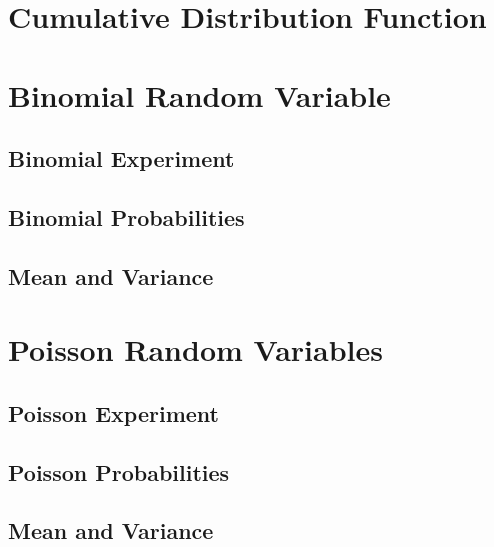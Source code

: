     \section{Cumulative Distribution Function}  %

    \section{Binomial Random Variable}  %
        \subsection{Binomial Experiment}  %
        \subsection{Binomial Probabilities}  %
        \subsection{Mean and Variance}  %

    \section{Poisson Random Variables}  %
        \subsection{Poisson Experiment}  %
        \subsection{Poisson Probabilities}  %
        \subsection{Mean and Variance}  %
